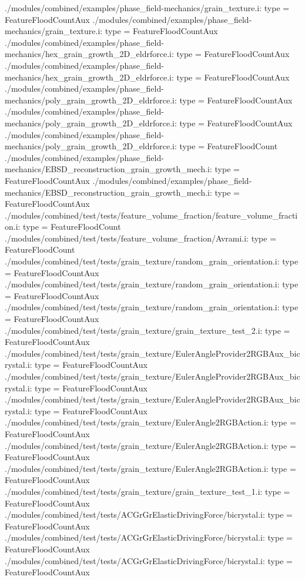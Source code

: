 ./modules/combined/examples/phase_field-mechanics/grain_texture.i:    type = FeatureFloodCountAux
./modules/combined/examples/phase_field-mechanics/grain_texture.i:    type = FeatureFloodCountAux
./modules/combined/examples/phase_field-mechanics/hex_grain_growth_2D_eldrforce.i:    type = FeatureFloodCountAux
./modules/combined/examples/phase_field-mechanics/hex_grain_growth_2D_eldrforce.i:    type = FeatureFloodCountAux
./modules/combined/examples/phase_field-mechanics/poly_grain_growth_2D_eldrforce.i:    type = FeatureFloodCountAux
./modules/combined/examples/phase_field-mechanics/poly_grain_growth_2D_eldrforce.i:    type = FeatureFloodCountAux
./modules/combined/examples/phase_field-mechanics/poly_grain_growth_2D_eldrforce.i:    type = FeatureFloodCount
./modules/combined/examples/phase_field-mechanics/EBSD_reconstruction_grain_growth_mech.i:    type = FeatureFloodCountAux
./modules/combined/examples/phase_field-mechanics/EBSD_reconstruction_grain_growth_mech.i:    type = FeatureFloodCountAux
./modules/combined/test/tests/feature_volume_fraction/feature_volume_fraction.i:    type = FeatureFloodCount
./modules/combined/test/tests/feature_volume_fraction/Avrami.i:    type = FeatureFloodCount
./modules/combined/test/tests/grain_texture/random_grain_orientation.i:    type = FeatureFloodCountAux
./modules/combined/test/tests/grain_texture/random_grain_orientation.i:    type = FeatureFloodCountAux
./modules/combined/test/tests/grain_texture/random_grain_orientation.i:    type = FeatureFloodCountAux
./modules/combined/test/tests/grain_texture/grain_texture_test_2.i:    type = FeatureFloodCountAux
./modules/combined/test/tests/grain_texture/EulerAngleProvider2RGBAux_bicrystal.i:    type = FeatureFloodCountAux
./modules/combined/test/tests/grain_texture/EulerAngleProvider2RGBAux_bicrystal.i:    type = FeatureFloodCountAux
./modules/combined/test/tests/grain_texture/EulerAngleProvider2RGBAux_bicrystal.i:    type = FeatureFloodCountAux
./modules/combined/test/tests/grain_texture/EulerAngle2RGBAction.i:    type = FeatureFloodCountAux
./modules/combined/test/tests/grain_texture/EulerAngle2RGBAction.i:    type = FeatureFloodCountAux
./modules/combined/test/tests/grain_texture/EulerAngle2RGBAction.i:    type = FeatureFloodCountAux
./modules/combined/test/tests/grain_texture/grain_texture_test_1.i:    type = FeatureFloodCountAux
./modules/combined/test/tests/ACGrGrElasticDrivingForce/bicrystal.i:    type = FeatureFloodCountAux
./modules/combined/test/tests/ACGrGrElasticDrivingForce/bicrystal.i:    type = FeatureFloodCountAux
./modules/combined/test/tests/ACGrGrElasticDrivingForce/bicrystal.i:    type = FeatureFloodCountAux
